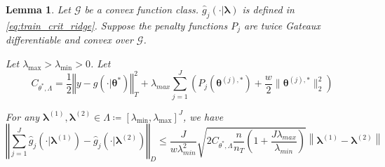 \documentclass[12pt]{article}
\newtheorem{lemma}{Lemma}
\begin{document}

\begin{lemma}
\label{lemma:nonparam_smooth}
Let $\mathcal{G}$ be a convex function class. $\hat{g}_{j}(\cdot| \boldsymbol \lambda)$ is defined in \ref{eq:train_crit_ridge}.
Suppose the penalty functions $P_{j}$ are twice Gateaux differentiable and convex over $\mathcal{G}$.

Let $\lambda_{\max} > \lambda_{\min} > 0 $. Let
\begin{equation}
C_{\theta^{*},\Lambda}=
\frac{1}{2}\left\Vert y- g(\cdot|\boldsymbol{\theta}^{*})\right\Vert _{T}^{2}
+\lambda_{max}\sum_{j=1}^{J}\left(P_{j}(\boldsymbol{\theta}^{(j),*})+\frac{w}{2}\|\boldsymbol{\theta}^{(j),*}\|_{2}^{2}\right)
\end{equation}

For any $\boldsymbol{\lambda}^{(1)}, \boldsymbol{\lambda}^{(2)} \in \Lambda \coloneqq \left [ \lambda_{\min}, \lambda_{\max} \right ]^J$, we have
\begin{equation}
\left\Vert 
\sum_{j=1}^J \hat{g}_j\left(\cdot|\boldsymbol{\lambda}^{(1)} \right)-\hat{g}_j\left(\cdot|\boldsymbol{\lambda}^{(2)} \right)\right\Vert _{D}
\le
\frac{J}{w\lambda_{min}^{2}}\sqrt{2C_{\theta^{*},\Lambda}\frac{n}{n_{T}}\left(1+\frac{J\lambda_{max}}{\lambda_{min}}\right)}
\left \|\boldsymbol{\lambda}^{(1)}-\boldsymbol{\lambda}^{(2)} \right \|
\end{equation}
\end{lemma}
\end{document}
